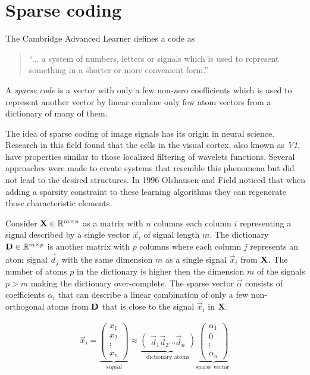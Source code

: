 \chapter{Sparse coding}
\label{chap:sparse_coding}

The Cambridge Advanced Learner defines a code as
\begin{quotation}
``... a system of numbers, letters or signals which is used to represent
something in a shorter or more convenient form.''
\end{quotation}
A \emph{sparse code} is a vector with only a few non-zero coefficients
which is used to represent another vector by linear combine only few atom
vectors from a dictionary of many of them.

The idea of sparse coding of image signals has its origin in neural science. 
Research in this field found that the cells in the visual cortex, also known as
\emph{V1}, have properties similar to those localized filtering of wavelets
functions. Several approaches were made to create systems that resemble this
phenomena but did not lead to the desired structures. In 1996 Olshausen and
Field\cite{Olshausen1996} noticed that when adding a sparsity constraint to
these learning algorithms they can regenerate those characteristic elements.

\newpage %
Consider $\boldsymbol{\mathrm{X}} \in \mathbb{R}^{m\times n}$  as a matrix with $n$ columns each
column $i$ representing a signal described by a single vector $\vec{x}_{i}$ of
signal length $m$. The dictionary $\boldsymbol{\mathrm{D}}\in\mathbb{R}^{m \times p}$ is another
matrix with $p$ columns where each column $j$ represents an atom signal
$\vec{d}_j$ with the same dimension $m$ as a single signal $\vec{x}_{i}$ from
$\boldsymbol{\mathrm{X}}$. The number of atoms $p$ in the dictionary is higher then the
dimension $m$ of the signals $p > m$ making the dictionary over-complete. The
sparse vector $\vec{\alpha}$ consists of coefficients $\alpha_i$ that can
describe a linear
combination of only a few non-orthogonal atoms from $\boldsymbol{\mathrm{D}}$ that is close to
the signal $\vec{x}_i $ in $\boldsymbol{\mathrm{X}}$. 

\begin{align*}
\vec{x}_i = \underbrace{\begin{pmatrix} x_1 \\ x_2 \\ \vdots \\ x_n
\end{pmatrix}}_{signal}
\approx \underbrace{\begin{pmatrix} \vec{d}_1  \vec{d}_2 \cdots \vec{d}_n
\end{pmatrix}}_{\textrm{dictionary atoms}}
\underbrace{\begin{pmatrix} \alpha_1 \\ 0 \\ \vdots \\ \alpha_n
\end{pmatrix}}_{\textrm{sparse vector }}
\end{align*}

